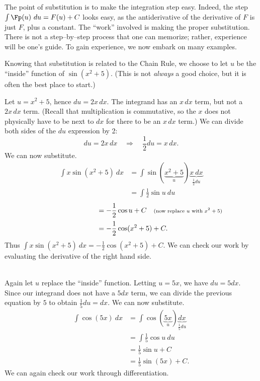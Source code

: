 The point of substitution is to make the integration step easy. Indeed, the step $\int \Fp(u)\ du = F(u) + C$ looks easy, as the antiderivative of the derivative of $F$ is just $F$, plus a constant. The ``work'' involved is making the proper substitution. There is not a step--by--step process that one can memorize; rather, experience will be one's guide. To gain experience, we now embark on many examples.\\

{Knowing that substitution is related to the Chain Rule, we choose to let $u$ be the ``inside'' function of $\sin(x^2+5)$. (This is not \emph{always} a good choice, but it is often the best place to start.)

Let $u = x^2+5$, hence $du = 2x\,dx$. The integrand has an $x\,dx$ term, but not a $2x\,dx$ term. (Recall that multiplication is commutative, so the $x$ does not physically have to be next to $dx$ for there to be an $x\,dx$ term.) We can divide both sides of the $du$ expression by 2:
	$$du = 2x\,dx \quad \Rightarrow \quad \frac12du = x\,dx.$$ We can now substitute.
	\begin{align*}\int x\sin(x^2+5)\ dx &= \int \sin(\underbrace{x^2+5}_u) \underbrace{x\ dx}_{\frac12du}\\
						 &= \int \frac12\sin u\ du
\end{align*}
\begin{align*}
			\phantom{\int x\sin(x^2+5)\ dx} &= -\frac12\cos u + C \quad \text{\scriptsize (now replace $u$ with $x^2+5$)}\\
						 &=-\frac12\cos(x^2+5) + C.
	\end{align*}
Thus $\int x\sin(x^2+5)\ dx = -\frac12\cos(x^2+5)+C$. We can check our work by evaluating the derivative of the right hand side.
}\\

{Again let $u$ replace the ``inside'' function. Letting $u = 5x$, we have $du = 5dx$. Since our integrand does not have a $5dx$ term, we can divide the previous equation by $5$ to obtain $\frac15du = dx$. We can now substitute.
\begin{align*}
	\int \cos(5x)\ dx &= \int \cos(\underbrace{5x}_u) \underbrace{dx}_{\frac15du} \\
									&=	\int \frac15\cos u \ du \\
									&= \frac15\sin u + C \\
									&= \frac15\sin (5x)+C.
\end{align*}
We can again check our work through differentiation.
}\\


